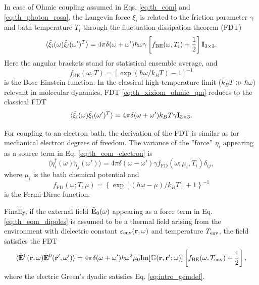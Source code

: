 In case of Ohmic coupling assumed in Eqs. \eqref{eq:th_eom} and \eqref{eq:th_photon_rosa}, the Langevin force $\xi_i$ is related to the friction parameter $\gamma$ and bath temperature $T_i$ through the fluctuation-dissipation theorem (FDT) \cite{weiss,dhar06}
\begin{equation}
 \langle \tilde \xi_i(\omega) \tilde \xi_i(\omega')^T \rangle = 4\pi \delta(\omega+\omega') \hbar \omega \gamma \left[f_{\textrm{BE}}(\omega,T_i)+ \frac{1}{2} \right] \mathbf{I}_{3\times 3}. \label{eq:th_xixiom_ohmic_qm}
\end{equation}
Here the angular brackets stand for statistical ensemble average, and 
\begin{equation}
 f_{\textrm{BE}}(\omega,T)=\left[\exp(\hbar \omega/k_BT)-1\right]^{-1}
\end{equation}
is the Bose-Einstein function. In the classical high-temperature limit ($k_B T \gg \hbar \omega$) relevant in molecular dynamics, FDT \eqref{eq:th_xixiom_ohmic_qm} reduces to the classical FDT
\begin{equation}
 \langle \tilde \xi_i(\omega) \tilde \xi_i(\omega')^T \rangle = 4\pi \delta(\omega+\omega') k_B T \gamma \mathbf{I}_{3\times 3}. \label{eq:th_xixiom_ohmic_classical}
\end{equation}

For coupling to an electron bath, the derivation of the FDT is similar as for mechanical electron degrees of freedom. The variance of the ''force'' $\eta_i$ appearing as a source term in Eq. \eqref{eq:th_eom_electron} is \cite{dhar03}
\begin{equation}
 \langle \tilde \eta_{i}^{\dagger}(\omega) \tilde \eta_{j}(\omega') \rangle = 4\pi\delta(\omega-\omega') \gamma f_{\textrm{FD}}(\omega;\mu_{i},T_{i}) \delta_{ij},
\end{equation}
where $\mu_i$ is the bath chemical potential and 
\begin{equation}
 f_{\textrm{FD}}(\omega;T,\mu)=\left\{\exp\left[(\hbar \omega-\mu)/k_BT\right]+1\right\}^{-1}
\end{equation}
is the Fermi-Dirac function.

Finally, if the external field $\tilde{\mathbf{E}}_0(\omega)$ appearing as a force term in Eq. \eqref{eq:th_eom_dipoles} is assumed to be a thermal field arising from the environment with dielectric constant $\varepsilon_{\textrm{env}}(\mathbf{r},\omega)$ and temperature $T_{\textrm{env}}$, the field satisfies the FDT \cite{novotny}
\begin{equation}
 \langle \tilde {\mathbf{E}}^0(\mathbf{r},\omega) \tilde {\mathbf{E}}^0(\mathbf{r}',\omega') \rangle = 4\pi \delta(\omega+\omega') \hbar \omega^2 \mu_0 \textrm{Im}[\mathbb{G}(\mathbf{r},\mathbf{r}';\omega)] \left[f_{\textrm{BE}}(\omega,T_{\textrm{env}})+ \frac{1}{2} \right],
\end{equation}
where the electric Green's dyadic satisfies Eq. \eqref{eq:intro_gemdef}.


